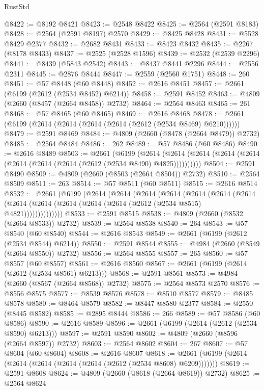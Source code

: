 \begin{lexlean}{RustStd}
\begin{coremodule}
@8422 := @8192 @8421
@8423 := @2548 @8422
@8425 := @2564 (@2591 @8183)
@8428 := @2564 (@2591 @8197) @2570
@8429 := @8425 @8428
@8431 := @5528 @8429 @2377
@8432 := @2682 @8431
@8433 := @8423 @8432
@8435 := @2267 (@8178 @8433)
@8437 := @2525 (@2528 @1596)
@8439 := @2532 (@2539 @2296)
@8441 := @8439 (@5843 @2542)
@8443 := @8437 @8441 @2296
@8444 := @2556 @2311
@8445 := @2876 @8444
@8447 := @2559 (@2560 @1751)
@8448 := 260
@8451 := @57 @8448 (@60 @8448)
@8452 := @2616 @8451
@8457 := @2661 (@6199 (@2612 (@2534 @8452) @6214))
@8458 := @2591 @8452
@8463 := @4809 (@2660 (@8457 (@2664 @8458)) @2732)
@8464 := @2564 @8463
@8465 := 261
@8468 := @57 @8465 (@60 @8465)
@8469 := @2616 @8468
@8478 := @2661 (@6199 (@2614 (@2614 (@2614 (@2614 (@2612 (@2534 @8469) @6210))))))
@8479 := @2591 @8469
@8484 := @4809 (@2660 (@8478 (@2664 @8479)) @2732)
@8485 := @2564 @8484
@8486 := 262
@8489 := @57 @8486 (@60 @8486)
@8490 := @2616 @8489
@8503 := @2661
    (@6199
      (@2614 (@2614 (@2614 (@2614 (@2614 (@2614 (@2614 (@2614 (@2612 (@2534 @8490) @4825))))))))))
@8504 := @2591 @8490
@8509 := @4809 (@2660 (@8503 (@2664 @8504)) @2732)
@8510 := @2564 @8509
@8511 := 263
@8514 := @57 @8511 (@60 @8511)
@8515 := @2616 @8514
@8532 := @2661
    (@6199
      (@2614
        (@2614
          (@2614
            (@2614
              (@2614
                (@2614
                  (@2614 (@2614 (@2614 (@2614 (@2614 (@2614 (@2612 (@2534 @8515) @4821))))))))))))))
@8533 := @2591 @8515
@8538 := @4809 (@2660 (@8532 (@2664 @8533)) @2732)
@8539 := @2564 @8538
@8540 := 264
@8543 := @57 @8540 (@60 @8540)
@8544 := @2616 @8543
@8549 := @2661 (@6199 (@2612 (@2534 @8544) @6214))
@8550 := @2591 @8544
@8555 := @4984 (@2660 (@8549 (@2664 @8550)) @2732)
@8556 := @2564 @8555
@8557 := 265
@8560 := @57 @8557 (@60 @8557)
@8561 := @2616 @8560
@8567 := @2661 (@6199 (@2614 (@2612 (@2534 @8561) @6213)))
@8568 := @2591 @8561
@8573 := @4984 (@2660 (@8567 (@2664 @8568)) @2732)
@8575 := @2564 @8573 @2570
@8576 := @8556 @8575
@8577 := @8539 @8576
@8578 := @8510 @8577
@8579 := @8485 @8578
@8580 := @8464 @8579
@8582 := @8447 @8580 @2377
@8584 := @2550 (@8445 @8582)
@8585 := @2895 @8444
@8586 := 266
@8589 := @57 @8586 (@60 @8586)
@8590 := @2616 @8589
@8596 := @2661 (@6199 (@2614 (@2612 (@2534 @8590) @6213)))
@8597 := @2591 @8590
@8602 := @4809 (@2660 (@8596 (@2664 @8597)) @2732)
@8603 := @2564 @8602
@8604 := 267
@8607 := @57 @8604 (@60 @8604)
@8608 := @2616 @8607
@8618 := @2661 (@6199 (@2614 (@2614 (@2614 (@2614 (@2614 (@2612 (@2534 @8608) @6209)))))))
@8619 := @2591 @8608
@8624 := @4809 (@2660 (@8618 (@2664 @8619)) @2732)
@8625 := @2564 @8624

\end{coremodule}
\end{lexlean}
